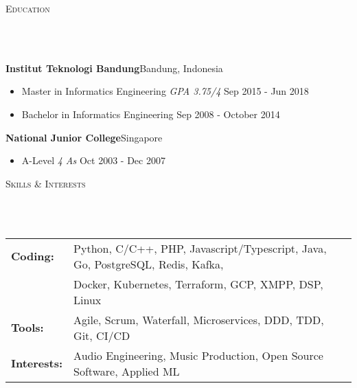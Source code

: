 \documentclass{article}
\newcommand{\lineunder} {
    \vspace*{-8pt} \\
    \hspace*{-10pt} \hrulefill \\
}
\newcommand{\header} [1] {
    \begin{center}
      {\large \scshape {#1}}
      \lineunder
    \end{center}
    \vspace*{-8pt}
}
\begin{document}
\vspace{-2mm}
\header{Education}
\vspace{1mm}

\textbf{Institut Teknologi Bandung}\hfill Bandung, Indonesia\\
\vspace{-3mm}
\begin{itemize}[align=left, left=0pt..1em, itemsep=-2pt]
  \item Master in Informatics Engineering \textit{GPA 3.75/4} \hfill Sep 2015 - Jun 2018
  \item Bachelor in Informatics Engineering \hfill Sep 2008 - October 2014
\end{itemize}
\vspace{-2mm}
\textbf{National Junior College}\hfill Singapore\\
\vspace{-3mm}
\begin{itemize}[align=left, left=0pt..1em, itemsep=-2pt]
  \item A-Level \textit{4 As} \hfill Oct 2003 - Dec 2007
\end{itemize}

\vspace{-3mm}
\header{Skills \& Interests}
\vspace{2mm}
\hspace{-4mm}
\begin{tabular}{ l l }
\textbf{Coding:} & Python, C/C++, PHP, Javascript/Typescript, Java, Go,
PostgreSQL, Redis, Kafka,\\
\vspace{1mm}
                 & Docker, Kubernetes, Terraform, GCP, XMPP, DSP, Linux\\

\textbf{Tools:}
\vspace{1mm}
& Agile, Scrum, Waterfall, Microservices, DDD, TDD, Git, CI/CD \\

\textbf{Interests:}
\vspace{1mm}
& Audio Engineering, Music Production, Open Source Software, Applied ML\\

\end{tabular}
\vspace{2mm}
\end{document}
